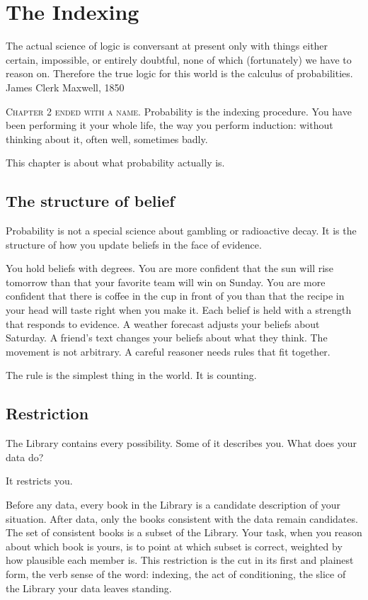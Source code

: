 \chapter{The Indexing}

\chapterepigraph
{The actual science of logic is conversant at present only with things either certain, impossible, or entirely doubtful, none of which (fortunately) we have to reason on. Therefore the true logic for this world is the calculus of probabilities.}
{James Clerk Maxwell, 1850}

\noindent \textsc{Chapter 2 ended with a name.} Probability is the indexing procedure. You have been performing it your whole life, the way you perform induction: without thinking about it, often well, sometimes badly.

This chapter is about what probability actually is.

\section*{The structure of belief}

Probability is not a special science about gambling or radioactive decay. It is the structure of how you update beliefs in the face of evidence.

You hold beliefs with degrees. You are more confident that the sun will rise tomorrow than that your favorite team will win on Sunday. You are more confident that there is coffee in the cup in front of you than that the recipe in your head will taste right when you make it. Each belief is held with a strength that responds to evidence. A weather forecast adjusts your beliefs about Saturday. A friend's text changes your beliefs about what they think. The movement is not arbitrary. A careful reasoner needs rules that fit together.

The rule is the simplest thing in the world. It is counting.

\section*{Restriction}

The Library contains every possibility. Some of it describes you. What does your data do?

It restricts you.

Before any data, every book in the Library is a candidate description of your situation. After data, only the books consistent with the data remain candidates. The set of consistent books is a subset of the Library. Your task, when you reason about which book is yours, is to point at which subset is correct, weighted by how plausible each member is. This restriction is the cut in its first and plainest form, the verb sense of the word: indexing, the act of conditioning, the slice of the Library your data leaves standing.


